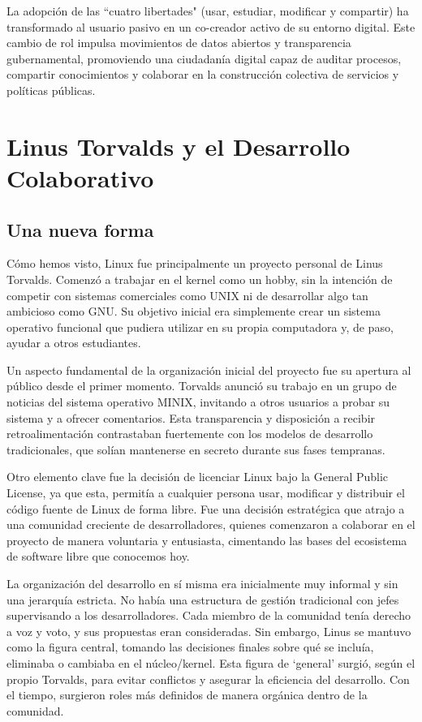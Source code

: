 \documentclass[a4paper,12pt]{article}
\begin{document}
La adopción de las ``cuatro libertades" (usar, estudiar, modificar y compartir)
ha transformado al usuario pasivo en un co-creador activo de su entorno digital.
Este cambio de rol impulsa movimientos de datos abiertos y transparencia
gubernamental, promoviendo una ciudadanía digital capaz de auditar procesos,
compartir conocimientos y colaborar en la construcción colectiva de servicios y
políticas públicas.


\newpage
\section{Linus Torvalds y el Desarrollo Colaborativo}

\subsection{Una nueva forma}

Cómo hemos visto, Linux fue principalmente un proyecto personal de Linus Torvalds.
Comenzó a trabajar en el kernel como un hobby, sin la intención de competir con
sistemas comerciales como UNIX ni de desarrollar algo tan ambicioso como GNU. Su
objetivo inicial era simplemente crear un sistema operativo funcional que
pudiera utilizar en su propia computadora y, de paso, ayudar a otros
estudiantes.

Un aspecto fundamental de la organización inicial del proyecto fue su apertura
al público desde el primer momento. Torvalds anunció su trabajo en un grupo de
noticias del sistema operativo MINIX, invitando a otros usuarios a probar su
sistema y a ofrecer comentarios. Esta transparencia y disposición a recibir
retroalimentación contrastaban fuertemente con los modelos de desarrollo
tradicionales, que solían mantenerse en secreto durante sus fases tempranas.

Otro elemento clave fue la decisión de licenciar Linux bajo la General
Public License, ya que esta, permitía a cualquier persona usar, modificar
y distribuir el código fuente de Linux de forma libre. Fue una decisión
estratégica que atrajo a una comunidad creciente de desarrolladores, quienes
comenzaron a colaborar en el proyecto de manera voluntaria y entusiasta,
cimentando las bases del ecosistema de software libre que conocemos hoy.

La organización del desarrollo en sí misma era inicialmente muy informal y sin
una jerarquía estricta. No había una estructura de gestión tradicional con jefes
supervisando a los desarrolladores. Cada miembro de la comunidad tenía derecho a
voz y voto, y sus propuestas eran consideradas. Sin embargo, Linus se
mantuvo como la figura central, tomando las decisiones finales sobre qué se
incluía, eliminaba o cambiaba en el núcleo/kernel. Esta figura de `general'
surgió, según el propio Torvalds, para evitar conflictos y asegurar la
eficiencia del desarrollo.  Con el tiempo, surgieron roles más definidos de
manera orgánica dentro de la comunidad.
\end{document}
